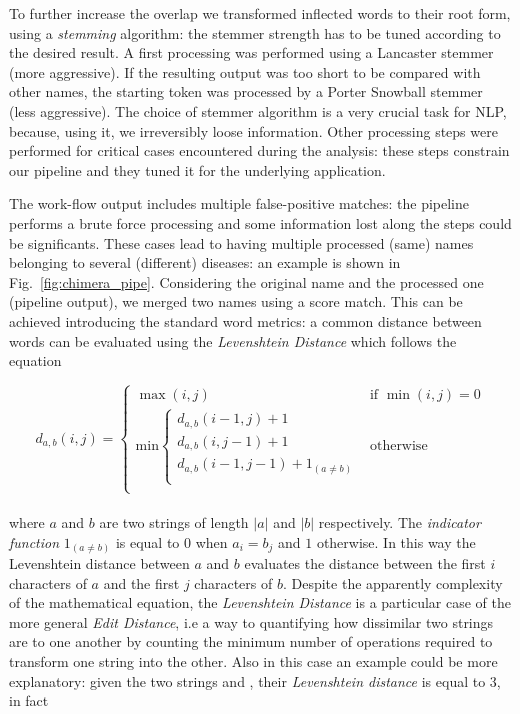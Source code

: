 \documentclass{standalone}
\begin{document}
To further increase the overlap we transformed inflected words to their root form, using a \emph{stemming} algorithm: the stemmer strength has to be tuned according to the desired result.
A first processing was performed using a \textsf{Lancaster} stemmer (more aggressive).
If the resulting output was too short to be compared with other names, the starting token was processed by a \textsf{Porter Snowball} stemmer (less aggressive).
The choice of stemmer algorithm is a very crucial task for NLP, because, using it, we irreversibly loose information.
Other processing steps were performed for critical cases encountered during the analysis: these steps constrain our pipeline and they tuned it for the underlying application.

The work-flow output includes multiple false-positive matches: the pipeline performs a brute force processing and some information lost along the steps could be significants.
These cases lead to having multiple processed (same) names belonging to several (different) diseases: an example is shown in Fig.~\ref{fig:chimera_pipe}.
Considering the original name and the processed one (pipeline output), we merged two names using a score match.
This can be achieved introducing the standard word metrics: a common distance between words can be evaluated using the \emph{Levenshtein Distance} which follows the equation

$$
d_{a, b}(i, j) = \left\{ \begin{array}{rc}
  \max(i, j)                                                       & \mbox{if   } \min(i, j) = 0 \\
  \mbox{min} \left\{ \begin{array}{r}
      d_{a, b}(i - 1, j) + 1                     \\
      d_{a, b}(i, j - 1) + 1                     \\
      d_{a, b}(i - 1, j - 1) + 1_{(a \neq b)}    \\
    \end{array}
    \right.                                                        & \mbox{otherwise}            \\

  \end{array}
  \right.
$$
\\
where $a$ and $b$ are two strings of length $|a|$ and $|b|$ respectively.
The \emph{indicator function} $1_{(a \neq b)}$ is equal to $0$ when $a_i = b_j$ and $1$ otherwise.
In this way the Levenshtein distance between $a$ and $b$ evaluates the distance between the first $i$ characters of $a$ and the first $j$ characters of $b$.
Despite the apparently complexity of the mathematical equation, the \emph{Levenshtein Distance} is a particular case of the more general \emph{Edit Distance}, i.e a way to quantifying how dissimilar two strings are to one another by counting the minimum number of operations required to transform one string into the other.
Also in this case an example could be more explanatory: given the two strings  and , their \emph{Levenshtein distance} is equal to $3$, in fact
\end{document}
